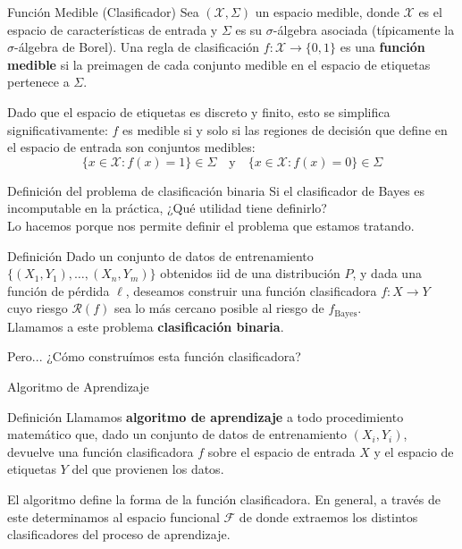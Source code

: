 \documentclass[aspectratio=169, 10pt]{beamer}
\begin{document}
\begin{frame}
  \begin{block}{Función Medible (Clasificador)}
    Sea $(\mathcal{X}, \Sigma)$ un espacio medible, donde $\mathcal{X}$ es el espacio de características de entrada y $\Sigma$ es su $\sigma$-álgebra asociada (típicamente la $\sigma$-álgebra de Borel). Una regla de clasificación $f: \mathcal{X} \to \{0, 1\}$ es una \textbf{función medible} si la preimagen de cada conjunto medible en el espacio de etiquetas pertenece a $\Sigma$.
    \end{block}
    \begin{block}{}
Dado que el espacio de etiquetas es discreto y finito, esto se simplifica significativamente: $f$ es medible si y solo si las regiones de decisión que define en el espacio de entrada son conjuntos medibles:
\[
\{x \in \mathcal{X} : f(x) = 1\} \in \Sigma \quad \text{y} \quad \{x \in \mathcal{X} : f(x) = 0\} \in \Sigma
\]
  \end{block}


\end{frame}

\begin{frame}{Definición del problema de clasificación binaria}
  Si el clasificador de Bayes es incomputable en la práctica, ¿Qué utilidad tiene definirlo?\\
\pause
\bigskip
  Lo hacemos porque nos permite definir el problema que estamos tratando.

\pause
\bigskip
  \begin{block}{Definición}
  \Large
  Dado un conjunto de datos de entrenamiento $ \{ (X_1,Y_1), \dots ,(X_n, Y_m)\}$
obtenidos iid de una distribución $P$, y dada una función de pérdida $\ell$, deseamos construir una función clasificadora
$f:X\rightarrow Y$ cuyo riesgo $\mathcal{R}(f)$ sea lo más cercano posible al riesgo de $f_{\text{Bayes}}$.\\

Llamamos a este problema \textbf{clasificación binaria}.
  \end{block}
\pause
\bigskip
Pero... ¿Cómo construímos esta función clasificadora?
\end{frame}

\begin{frame}{Algoritmo de Aprendizaje}
  \begin{block}{Definición}
    \Large
    Llamamos \textbf{algoritmo de aprendizaje} a todo procedimiento matemático que, dado un conjunto
de datos de entrenamiento $(X_i,Y_i)$, devuelve una función clasificadora $f$ sobre el espacio de entrada $X$ 
y el espacio de etiquetas $Y$ del que
provienen los datos.
  \end{block}
\pause
\bigskip
  El algoritmo define la forma de la función clasificadora. En general, a través de este determinamos al espacio funcional $\mathcal{F}$ de
  donde extraemos los distintos clasificadores del proceso de aprendizaje.
\end{frame}
\end{document}
